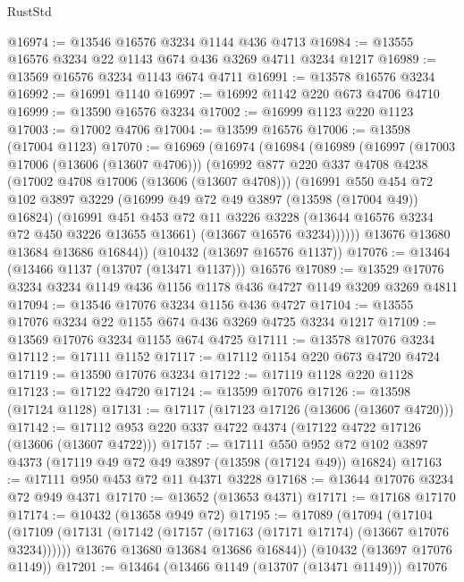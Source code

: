 \begin{lexlean}{RustStd}
\begin{coremodule}
@16974 := @13546 @16576 @3234 @1144 @436 @4713
@16984 := @13555 @16576 @3234 @22 @1143 @674 @436 @3269 @4711 @3234 @1217
@16989 := @13569 @16576 @3234 @1143 @674 @4711
@16991 := @13578 @16576 @3234
@16992 := @16991 @1140
@16997 := @16992 @1142 @220 @673 @4706 @4710
@16999 := @13590 @16576 @3234
@17002 := @16999 @1123 @220 @1123
@17003 := @17002 @4706
@17004 := @13599 @16576
@17006 := @13598 (@17004 @1123)
@17070 := @16969
    (@16974
      (@16984
        (@16989
          (@16997
            (@17003 @17006 (@13606 (@13607 @4706)))
            (@16992
              @877
              @220
              @337
              @4708
              @4238
              (@17002 @4708 @17006 (@13606 (@13607 @4708)))
              (@16991
                @550
                @454
                @72
                @102
                @3897
                @3229
                (@16999 @49 @72 @49 @3897 (@13598 (@17004 @49)) @16824)
                (@16991
                  @451
                  @453
                  @72
                  @11
                  @3226
                  @3228
                  (@13644 @16576 @3234 @72 @450 @3226 @13655 @13661)
                  (@13667 @16576 @3234))))))
        @13676
        @13680
        @13684
        @13686
        @16844))
    (@10432 (@13697 @16576 @1137))
@17076 := @13464 (@13466 @1137 (@13707 (@13471 @1137))) @16576
@17089 := @13529 @17076 @3234 @3234 @1149 @436 @1156 @1178 @436 @4727 @1149 @3209 @3269 @4811
@17094 := @13546 @17076 @3234 @1156 @436 @4727
@17104 := @13555 @17076 @3234 @22 @1155 @674 @436 @3269 @4725 @3234 @1217
@17109 := @13569 @17076 @3234 @1155 @674 @4725
@17111 := @13578 @17076 @3234
@17112 := @17111 @1152
@17117 := @17112 @1154 @220 @673 @4720 @4724
@17119 := @13590 @17076 @3234
@17122 := @17119 @1128 @220 @1128
@17123 := @17122 @4720
@17124 := @13599 @17076
@17126 := @13598 (@17124 @1128)
@17131 := @17117 (@17123 @17126 (@13606 (@13607 @4720)))
@17142 := @17112 @953 @220 @337 @4722 @4374 (@17122 @4722 @17126 (@13606 (@13607 @4722)))
@17157 := @17111
    @550
    @952
    @72
    @102
    @3897
    @4373
    (@17119 @49 @72 @49 @3897 (@13598 (@17124 @49)) @16824)
@17163 := @17111 @950 @453 @72 @11 @4371 @3228
@17168 := @13644 @17076 @3234 @72 @949 @4371
@17170 := @13652 (@13653 @4371)
@17171 := @17168 @17170
@17174 := @10432 (@13658 @949 @72)
@17195 := @17089
    (@17094
      (@17104
        (@17109 (@17131 (@17142 (@17157 (@17163 (@17171 @17174) (@13667 @17076 @3234))))))
        @13676
        @13680
        @13684
        @13686
        @16844))
    (@10432 (@13697 @17076 @1149))
@17201 := @13464 (@13466 @1149 (@13707 (@13471 @1149))) @17076

\end{coremodule}
\end{lexlean}
